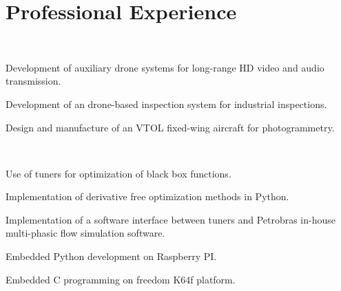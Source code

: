 \documentclass[A4]{deedy-resume} %
\begin{document}
\begin{minipage}[t]{0.66\textwidth} %



\section{Professional Experience}

\\
\vspace{\topsep}
\begin{tightitemize}
 \item Development of auxiliary drone systems for long-range HD video and audio transmission.
 \item Development of an drone-based inspection system for industrial inspections.
 \item Design and manufacture of an VTOL fixed-wing aircraft for photogrammetry.
\end{tightitemize}
\sectionspace %

\\

\begin{tightitemize}
 \item Use of tuners for optimization of black box functions.
 \item Implementation of derivative free optimization methods in Python.
 \item Implementation of a software interface between tuners and Petrobras in-house multi-phasic flow simulation software.

\end{tightitemize}

\sectionspace %

\vspace{\topsep} %
\begin{tightitemize}
 \item Embedded Python development on Raspberry PI.
 \item Embedded C programming on freedom K64f platform.
\end{tightitemize}


\end{minipage}
\end{document}
